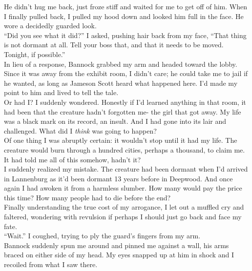 \documentclass[a5paper]{scrartcl}
\begin{document}
He didn't hug me back, just froze stiff and waited for me to get off of him. When I finally pulled back, I pulled my hood down and looked him full in the face. He wore a decidedly guarded look.   \\


\enquote{Did you see what it did?} I asked, pushing hair back from my face, \enquote{That thing is not dormant at all. Tell your boss that, and that it needs to be moved. Tonight, if possible.}\\


In lieu of a response, Bannock grabbed my arm and headed toward the lobby. Since it was away from the exhibit room, I didn't care; he could take me to jail if he wanted, as long as Jameson Scott heard what happened here. I'd made my point to him and lived to tell the tale. \\


Or had I? I suddenly wondered.  Honestly if I'd learned anything in that room, it had been that the creature hadn't forgotten me- the girl that got away. My life was a black mark on its record, an insult.  And I had gone into its lair and challenged. What did I \textit{think}
 was going to happen?\\


Of one thing I was abruptly certain: it wouldn't stop until it had my life. The creature would burn through a hundred cities, perhaps a thousand, to claim me. It had told me all of this somehow, hadn't it?\\


I suddenly realized my mistake. The creature had been dormant when I'd arrived in Lannenburg as it'd been dormant 13 years before in Deepwood. And once again I had awoken it from a harmless slumber. How many would pay the price this time?   How many people had to die before the end? \\


Finally understanding the true cost of my arrogance, I let out a muffled cry and faltered, wondering with revulsion if perhaps I should just go back and face my fate. \\


\enquote{Wait.} I coughed, trying to ply the guard's fingers from my arm.\\


Bannock suddenly spun me around and pinned me against a wall, his arms braced on either side of my head. My eyes snapped up at him in shock and I recoiled from what I saw there.\\
\end{document}
